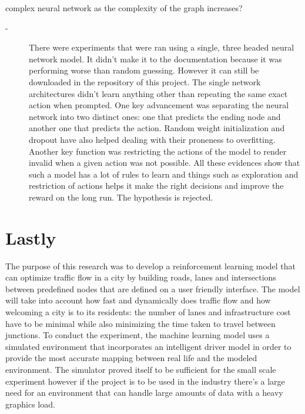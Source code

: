 \documentclass[
]{elteikthesis}[2023/04/10]
\begin{document}
\begin{enumerate}
complex neural network as the complexity of the graph increases? 
\begin{description}
\item [{-}] There were experiments that were ran using a single, three
headed neural network model. It didn't make it to the documentation
because it was performing worse than random guessing. However it can
still be downloaded in the repository of this project. The single
network architectures didn't learn anything other than repeating the
same exact action when prompted. One key advancement was separating
the neural network into two distinct ones: one that predicts the ending
node and another one that predicts the action. Random weight initialization
and dropout have also helped dealing with their proneness to overfitting.
Another key function was restricting the actions of the model to render
invalid when a given action was not possible. All these evidences
show that such a model has a lot of rules to learn and things such
as exploration and restriction of actions helps it make the right
decisions and improve the reward on the long run. The hypothesis is
rejected.
\end{description}
\end{enumerate}

\section*{Lastly}

The purpose of this research was to develop a reinforcement learning
model that can optimize traffic flow in a city by building roads,
lanes and intersections between predefined nodes that are defined
on a user friendly interface. The model will take into account how
fast and dynamically does traffic flow and how welcoming a city is
to its residents: the number of lanes and infrastructure cost have
to be minimal while also minimizing the time taken to travel between
junctions. To conduct the experiment, the machine learning model uses
a simulated environment that incorporates an intelligent driver model
in order to provide the most accurate mapping between real life and
the modeled environment. The simulator proved itself to be sufficient
for the small scale experiment however if the project is to be used
in the industry there's a large need for an environment that can handle
large amounts of data with a heavy graphics load.
\end{document}
